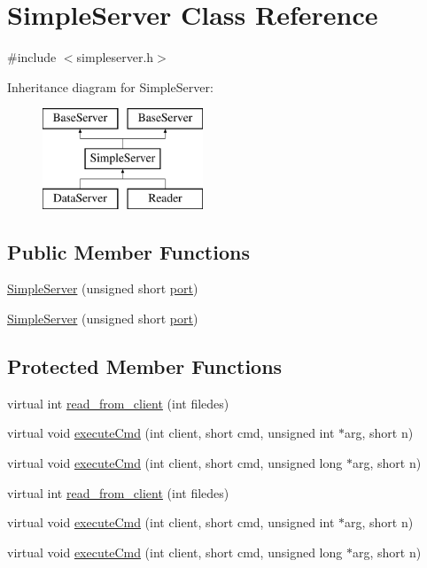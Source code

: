\hypertarget{classSimpleServer}{\section{Simple\-Server Class Reference}
\label{classSimpleServer}
}


{\ttfamily \#include $<$simpleserver.\-h$>$}

Inheritance diagram for Simple\-Server\-:\begin{figure}[H]
\begin{center}
\leavevmode
\includegraphics[height=3.000000cm]{classSimpleServer}
\end{center}
\end{figure}
\subsection*{Public Member Functions}
\begin{DoxyCompactItemize}
\item 
\hyperlink{classSimpleServer_aa4280135e2e20be8b8ae792e7119a061}{Simple\-Server} (unsigned short \hyperlink{classBaseServer_a66052c095234e31cada29b678b039c68}{port})
\item 
\hyperlink{classSimpleServer_aa4280135e2e20be8b8ae792e7119a061}{Simple\-Server} (unsigned short \hyperlink{classBaseServer_a66052c095234e31cada29b678b039c68}{port})
\end{DoxyCompactItemize}
\subsection*{Protected Member Functions}
\begin{DoxyCompactItemize}
\item 
virtual int \hyperlink{classSimpleServer_a1ff0dbc4a9c446fa4649410983b58311}{read\-\_\-from\-\_\-client} (int filedes)
\item 
virtual void \hyperlink{classSimpleServer_ad8244094d9e1806edaa166093c94bd24}{execute\-Cmd} (int client, short cmd, unsigned int $\ast$arg, short n)
\item 
virtual void \hyperlink{classSimpleServer_aabc58e7a255ae0efb25abdadbbaec527}{execute\-Cmd} (int client, short cmd, unsigned long $\ast$arg, short n)
\item 
virtual int \hyperlink{classSimpleServer_a1b032a7621374ef35a806af87253185a}{read\-\_\-from\-\_\-client} (int filedes)
\item 
virtual void \hyperlink{classSimpleServer_ad8244094d9e1806edaa166093c94bd24}{execute\-Cmd} (int client, short cmd, unsigned int $\ast$arg, short n)
\item 
virtual void \hyperlink{classSimpleServer_a4bbb57e575122b539fcddfa803cee206}{execute\-Cmd} (int client, short cmd, unsigned long $\ast$arg, short n)
\end{DoxyCompactItemize}
